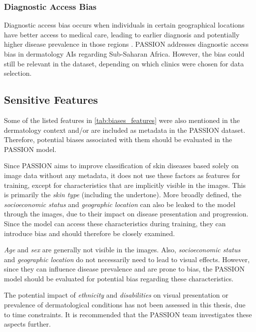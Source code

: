 \documentclass[12pt, a4paper, oneside]{book}   	%
\renewcommand{\paragraph}[1]{%
	\subsubsection*{#1}%
}
\begin{document}
		\paragraph{Diagnostic Access Bias}
		Diagnostic access bias occurs when individuals in certain geographical locations have better access to medical care, leading to earlier diagnosis and potentially higher disease prevalence in those regions \autocite{Chakraborty_2024}. PASSION addresses diagnostic access bias in dermatology \glspl{AI} regarding Sub-Saharan Africa. However, the bias could still be relevant in the dataset, depending on which clinics were chosen for data selection.
		
		
		\subsection{Sensitive Features}
			Some of the listed features in \autoref{tab:biases_features} were also mentioned in the dermatology context and/or are included as metadata in the PASSION dataset. Therefore, potential biases associated with them should be evaluated in the PASSION model.
			
			Since PASSION aims to improve classification of skin diseases based solely on image data without any metadata, it does not use these factors as features for training, except for characteristics that are implicitly visible in the images. This is primarily the \textit{skin type} (including the undertone). More broadly defined, the \textit{socioeconomic status} and \textit{geographic location} can also be leaked to the model through the images, due to their impact on disease presentation and progression. Since the model can access these characteristics during training, they can introduce bias and should therefore be closely examined.
			
			\textit{Age} and \textit{sex} are generally not visible in the images. Also, \textit{socioeconomic status} and \textit{geographic location} do not necessarily need to lead to visual effects. However, since they can influence disease prevalence and are prone to bias, the PASSION model should be evaluated for potential bias regarding these characteristics.
			
			The potential impact of \textit{ethnicity} and \textit{disabilities} on visual presentation or prevalence of dermatological conditions has not been assessed in this thesis, due to time constraints. It is recommended that the PASSION team investigates these aspects further.
			
\end{document}
